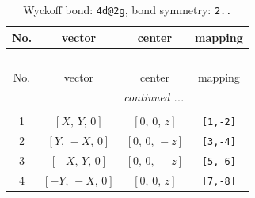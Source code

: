 \documentclass[fleqn,8pt]{jsarticle}
\begin{document}
\renewcommand{\arraystretch}{1.2}
\begin{longtable}{cccc}
\caption{Wyckoff bond: {\tt 4d@2g}, bond symmetry: {\tt 2..}}
 \\
 \hline \hline
No. & vector & center & mapping \\ \hline \endfirsthead

\multicolumn{3}{l}{\tablename\ \thetable{}} \\
 \hline \hline
No. & vector & center & mapping \\ \hline \endhead

 \hline \hline
\multicolumn{3}{r}{\footnotesize\it continued ...} \\ \endfoot

 \hline \hline
\multicolumn{3}{r}{} \\ \endlastfoot

1 & $\left[ X,\, Y,\, 0 \right]$ & $\left[ 0,\, 0,\, z \right]$ & {\tt [1,-2]} \\ \hline
2 & $\left[ Y,\, - X,\, 0 \right]$ & $\left[ 0,\, 0,\, - z \right]$ & {\tt [3,-4]} \\ \hline
3 & $\left[ - X,\, Y,\, 0 \right]$ & $\left[ 0,\, 0,\, - z \right]$ & {\tt [5,-6]} \\ \hline
4 & $\left[ - Y,\, - X,\, 0 \right]$ & $\left[ 0,\, 0,\, z \right]$ & {\tt [7,-8]} \\
\end{longtable}
\renewcommand{\arraystretch}{1.2}
\end{document}
